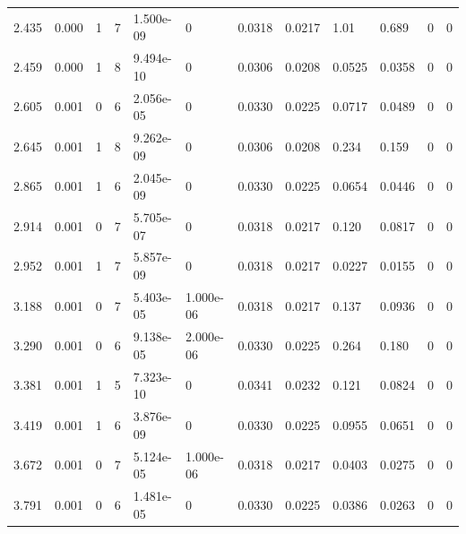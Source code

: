 \documentclass[preview]{standalone}
\begin{document}
{{\begin{tabular}{L{1.2cm}C{1.2cm} C{0.3cm}C{0.5cm} C{1.4cm}C{1.4cm} C{1.4cm}C{1.4cm} C{1.6cm}C{1.6cm} C{1.6cm}C{1.6cm}}
  2.435  &  0.000  & 1     &  7 &  1.500e-09  & 0  &  0.0318&   0.0217& 1.01 & 0.689   &  0 & 0  \\ 
  2.459  &  0.000  & 1     &  8 &  9.494e-10  & 0  &  0.0306&   0.0208& 0.0525 & 0.0358   &  0 & 0  \\ 
  2.605  &  0.001  & 0     &  6 &  2.056e-05  & 0  &  0.0330&   0.0225& 0.0717 & 0.0489   &  0 & 0  \\ 
  2.645  &  0.001  & 1     &  8 &  9.262e-09  & 0  &  0.0306&   0.0208& 0.234 & 0.159   &  0 & 0  \\ 
  2.865  &  0.001  & 1     &  6 &  2.045e-09  & 0  &  0.0330&   0.0225& 0.0654 & 0.0446   &  0 & 0  \\ 
  2.914  &  0.001  & 0     &  7 &  5.705e-07  & 0  &  0.0318&   0.0217& 0.120 & 0.0817   &  0 & 0  \\ 
  2.952  &  0.001  & 1     &  7 &  5.857e-09  & 0  &  0.0318&   0.0217& 0.0227 & 0.0155   &  0 & 0  \\ 
  3.188  &  0.001  & 0     &  7 &  5.403e-05  & 1.000e-06  &  0.0318&   0.0217& 0.137 & 0.0936   &  0 & 0  \\ 
  3.290  &  0.001  & 0     &  6 &  9.138e-05  & 2.000e-06  &  0.0330&   0.0225& 0.264 & 0.180   &  0 & 0  \\ 
  3.381  &  0.001  & 1     &  5 &  7.323e-10  & 0  &  0.0341&   0.0232& 0.121 & 0.0824   &  0 & 0  \\ 
  3.419  &  0.001  & 1     &  6 &  3.876e-09  & 0  &  0.0330&   0.0225& 0.0955 & 0.0651   &  0 & 0  \\ 
  3.672  &  0.001  & 0     &  7 &  5.124e-05  & 1.000e-06  &  0.0318&   0.0217& 0.0403 & 0.0275   &  0 & 0  \\ 
  3.791  &  0.001  & 0     &  6 &  1.481e-05  & 0  &  0.0330&   0.0225& 0.0386 & 0.0263   &  0 & 0  \\ 
\hline 
\end{tabular} 

}}
\end{document}
